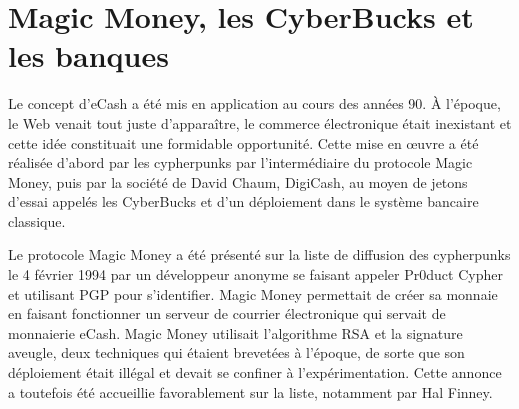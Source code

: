 
\section*{Magic Money, les CyberBucks et les banques} %

Le concept d'eCash a été mis en application au cours des années 90. À l'époque, le Web venait tout juste d'apparaître, le commerce électronique était inexistant et cette idée constituait une formidable opportunité. Cette mise en œuvre a été réalisée d'abord par les cypherpunks par l'intermédiaire du protocole Magic Money, puis par la société de David Chaum, DigiCash, au moyen de jetons d'essai appelés les CyberBucks et d'un déploiement dans le système bancaire classique. %

Le protocole Magic Money a été présenté sur la liste de diffusion des cypherpunks le 4 février 1994 par un développeur anonyme se faisant appeler Pr0duct Cypher et utilisant PGP pour s'identifier. Magic Money permettait de créer sa monnaie en faisant fonctionner un serveur de courrier électronique qui servait de monnaierie eCash. Magic Money utilisait l'algorithme RSA et la signature aveugle, deux techniques qui étaient brevetées à l'époque, de sorte que son déploiement était  illégal et devait se confiner à l'expérimentation. Cette annonce a toutefois été accueillie favorablement sur la liste, notamment par Hal Finney.

